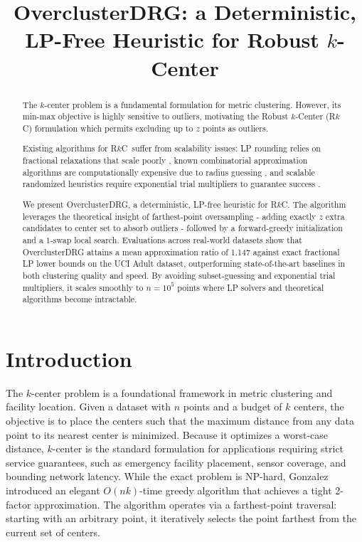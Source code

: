 \documentclass[twoside,leqno,twocolumn]{article}
\newcommand{\rkc}{R$k$C}
\begin{document}
\newcommand\relatedversion{}

\title{\Large OverclusterDRG: a Deterministic, LP-Free Heuristic for Robust $k$-Center\relatedversion}

\date{}

\maketitle


\begin{abstract}
The $k$-center problem is a fundamental formulation for metric clustering. However, its min-max objective is highly sensitive to outliers, motivating the Robust $k$-Center (\rkc) formulation which permits excluding up to $z$ points as outliers.

Existing algorithms for \rkc~suffer from scalability issues: LP rounding relies on fractional relaxations that scale poorly \cite{harris2017lottery,chakrabarty2016non}, known combinatorial approximation algorithms are computationally expensive due to radius guessing \cite{charikar2001}, and scalable randomized heuristics require exponential trial multipliers to guarantee success \cite{ding2019}.

We present OverclusterDRG, a deterministic, LP-free heuristic for \rkc. The algorithm leverages the theoretical insight of farthest-point oversampling - adding exactly $z$ extra candidates to center set to absorb outliers - followed by a forward-greedy initialization and a $1$-swap local search. Evaluations across real-world datasets show that OverclusterDRG attains a mean approximation ratio of 1.147 against exact fractional LP lower bounds on the UCI Adult dataset, outperforming state-of-the-art baselines in both clustering quality and speed. By avoiding subset-guessing and exponential trial multipliers, it scales smoothly to $n=10^5$ points where LP solvers and theoretical algorithms become intractable.
\end{abstract}


\section{Introduction}

The $k$-center problem is a foundational framework in metric clustering and facility location. Given a dataset with $n$ points and a budget of $k$ centers, the objective is to place the centers such that the maximum distance from any data point to its nearest center is minimized. Because it optimizes a worst-case distance, $k$-center is the standard formulation for applications requiring strict service guarantees, such as emergency facility placement, sensor coverage, and bounding network latency. While the exact problem is NP-hard, Gonzalez \cite{gonzalez1985} introduced an elegant $O(nk)$-time greedy algorithm that achieves a tight 2-factor approximation. The algorithm operates via a farthest-point traversal: starting with an arbitrary point, it iteratively selects the point farthest from the current set of centers.
\end{document}
